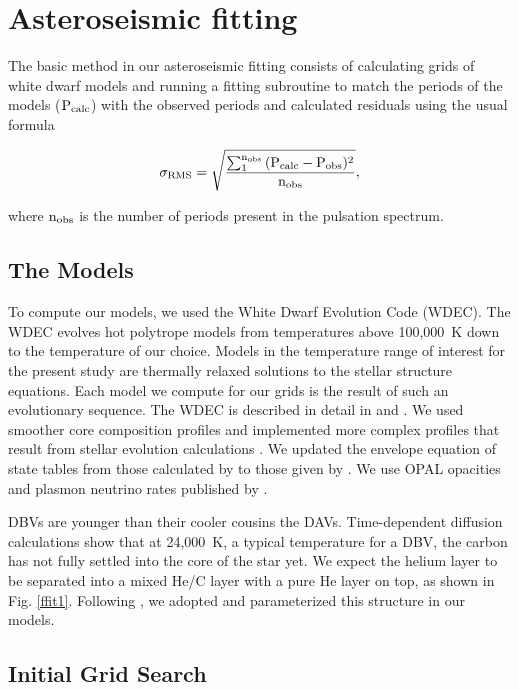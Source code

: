 \documentclass[12pt,preprint]{aastex}
\begin{document}
\section{Asteroseismic fitting}
\label{fitting}

The basic method in our asteroseismic fitting consists of calculating grids of white dwarf models and 
running a fitting subroutine to match the periods of the models ($\rm P_{calc}$) with the observed 
periods and calculated residuals using the usual formula

\begin{equation}
\label{fiteq1}
\rm \sigma_{RMS} = \sqrt{\frac{\sum_{1}^{n_{obs}} {(P_{calc}-P_{obs})^2}}{n_{obs}}},
\end{equation}

\noindent where $\rm n_{obs}$ is the number of periods present in the pulsation spectrum.

\subsection{The Models}
\label{models}

To compute our models, we used the White Dwarf Evolution Code (WDEC). The WDEC evolves hot 
polytrope models from temperatures above 100{,}000~K down to the temperature of our choice. 
Models in the temperature range of interest for the present study are thermally relaxed 
solutions to the stellar structure equations. Each model we compute for our grids is the result 
of such an evolutionary sequence. The WDEC is described in detail in \citet{Lamb75} and 
\citet{Wood90}. We used smoother core composition profiles and implemented more complex profiles 
that result from stellar evolution calculations \citep{Salaris97}. We updated the envelope 
equation of state tables from those calculated by \citet{Fontaine77} to those given by 
\citet{Saumon95}. We use OPAL opacities \citep{Iglesias96} and plasmon neutrino rates 
published by \citet{Itoh96}. 

DBVs are younger than their cooler cousins the DAVs. Time-dependent diffusion calculations 
\citep[e.g.][]{Dehner95,Althaus05} show that at 24{,}000~K, a typical temperature for a DBV, 
the carbon has not fully settled into the core of the star yet. We expect the helium layer to 
be separated into a mixed He/C layer with a pure He layer on top, as shown in Fig. \ref{ffit1}. 
Following \citet{Metcalfe05a}, we adopted and parameterized this structure in our models. 

\subsection{Initial Grid Search}
\label{grids}
\end{document}
